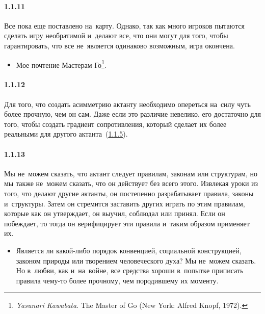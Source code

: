 \paragraph{1.1.11}\hypertarget{par:1.1.11}{} Все пока еще поставлено на~карту. Однако, так как много игроков пытаются сделать игру необратимой и~делают все, что они могут для того, чтобы гарантировать, что все не~является одинаково возможным, игра окончена.
	\begin{itemize}
	\item Мое почтение Мастерам Го\footnote{{\itshape Yasunari Kawabata}. The Master of Go (New York: Alfred Knopf, 1972).}.
	\end{itemize}

\paragraph{1.1.12}\hypertarget{par:1.1.12}{} Для того, что создать асимметрию актанту необходимо опереться на~силу чуть более прочную, чем он сам. Даже если это различие невелико, его достаточно для того, чтобы создать градиент сопротивления, который сделает их более реальными
для другого актанта~(\hyperlink{par:1.1.5}{1.1.5}).

\paragraph{1.1.13}\hypertarget{par:1.1.13}{} Мы не~можем сказать, что актант следует правилам, законам или структурам, но мы также не~можем сказать, что он действует без всего этого. Извлекая уроки из того, что делают другие актанты, он постепенно разрабатывает правила, законы и~структуры. Затем он стремится заставить других играть по этим правилам, которые
как он утверждает, он выучил, соблюдал или принял. Если он побеждает, то тогда он верифицирует эти правила и~таким образом применяет их. 
	\begin{itemize}
	\item Является ли какой-либо порядок конвенцией, социальной конструкцией, законом природы или творением человеческого духа? Мы не~можем сказать. Но в~любви, как и~на~войне, все средства хороши в~попытке приписать правила чему-то более прочному, чем породившему их моменту.

	\end{itemize}

